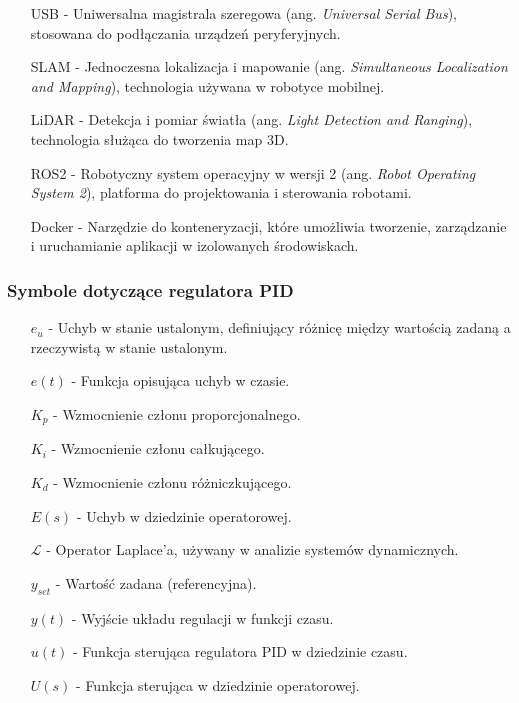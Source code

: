 \begin{itemize}
    \item[USB] - Uniwersalna magistrala szeregowa (ang. \textit{Universal Serial Bus}), stosowana do podłączania urządzeń peryferyjnych.
    \item[SLAM] - Jednoczesna lokalizacja i mapowanie (ang. \textit{Simultaneous Localization and Mapping}), technologia używana w robotyce mobilnej.
    \item[LiDAR] - Detekcja i pomiar światła (ang. \textit{Light Detection and Ranging}), technologia służąca do tworzenia map 3D.
    \item[ROS2] - Robotyczny system operacyjny w wersji 2 (ang. \textit{Robot Operating System 2}), platforma do projektowania i sterowania robotami.
    \item[Docker] - Narzędzie do konteneryzacji, które umożliwia tworzenie, zarządzanie i uruchamianie aplikacji w izolowanych środowiskach. 
\end{itemize}

\subsubsection*{Symbole dotyczące regulatora PID}

\begin{itemize}
    \item[\(e_u\)] - Uchyb w stanie ustalonym, definiujący różnicę między wartością zadaną a rzeczywistą w stanie ustalonym.
    \item[\(e(t)\)] - Funkcja opisująca uchyb w czasie.
    \item[\(K_p\)] - Wzmocnienie członu proporcjonalnego.
    \item[\(K_i\)] - Wzmocnienie członu całkującego.
    \item[\(K_d\)] - Wzmocnienie członu różniczkującego.
    \item[\(E(s)\)] - Uchyb w dziedzinie operatorowej.
    \item[\(\mathcal{L}\)] - Operator Laplace’a, używany w analizie systemów dynamicznych.
    \item[\(y_{set}\)] - Wartość zadana (referencyjna).
    \item[\(y(t)\)] - Wyjście układu regulacji w funkcji czasu.
    \item[\(u(t)\)] - Funkcja sterująca regulatora PID w dziedzinie czasu.
    \item[\(U(s)\)] - Funkcja sterująca w dziedzinie operatorowej.
\end{itemize}


